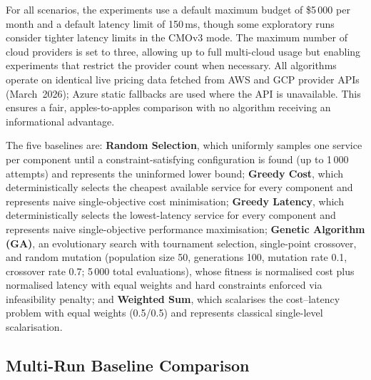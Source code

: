 \documentclass[journal]{IEEEtran}
\newcommand{\cmothree}{CMOv3\xspace}
\begin{document}
For all scenarios, the experiments use a default maximum budget of \$5\,000 per
month and a default latency limit of 150\,ms, though some exploratory runs
consider tighter latency limits in the \cmothree mode. The maximum number of
cloud providers is set to three, allowing up to full multi-cloud usage but
enabling experiments that restrict the provider count when necessary. All
algorithms operate on identical live pricing data fetched from AWS and GCP
provider APIs (March~2026); Azure static fallbacks are used where the API is
unavailable. This ensures a fair, apples-to-apples comparison with no algorithm
receiving an informational advantage.

The five baselines are: \textbf{Random Selection}, which uniformly samples one
service per component until a constraint-satisfying configuration is found (up
to 1\,000 attempts) and represents the uninformed lower bound; \textbf{Greedy
Cost}, which deterministically selects the cheapest available service for every
component and represents naive single-objective cost minimisation;
\textbf{Greedy Latency}, which deterministically selects the lowest-latency
service for every component and represents naive single-objective performance
maximisation; \textbf{Genetic Algorithm (GA)}, an evolutionary search with
tournament selection, single-point crossover, and random mutation (population
size 50, generations 100, mutation rate 0.1, crossover rate 0.7; 5\,000 total
evaluations), whose fitness is normalised cost plus normalised latency with
equal weights and hard constraints enforced via infeasibility penalty; and
\textbf{Weighted Sum}, which scalarises the cost--latency problem with equal
weights (0.5/0.5) and represents classical single-level scalarisation.

\subsection{Multi-Run Baseline Comparison}
\label{sec:multirun}
\end{document}
